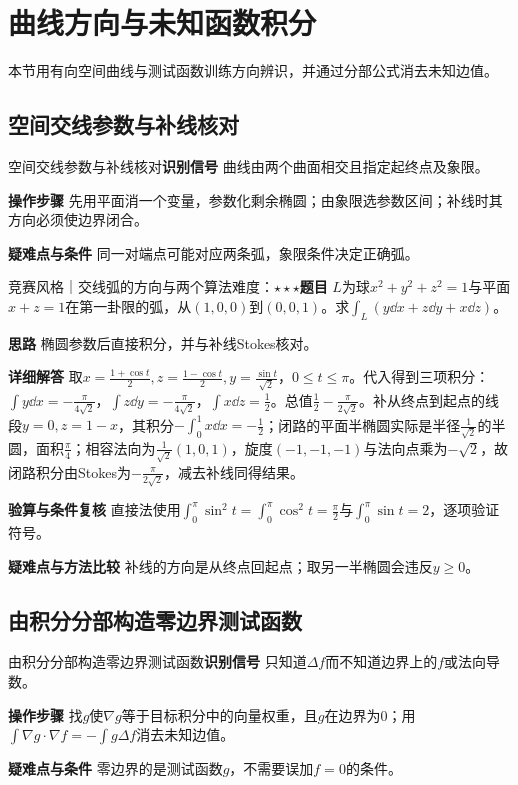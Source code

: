 \section{曲线方向与未知函数积分}\label{ic:delta_fields}

\begin{examtip}本节用有向空间曲线与测试函数训练方向辨识，并通过分部公式消去未知边值。\end{examtip}

\subsection{空间交线参数与补线核对}\label{ic:delta_fields:spaceorientation}\begin{method}{空间交线参数与补线核对}\textbf{识别信号} 曲线由两个曲面相交且指定起终点及象限。\par \textbf{操作步骤} 先用平面消一个变量，参数化剩余椭圆；由象限选参数区间；补线时其方向必须使边界闭合。\par \textbf{疑难点与条件} 同一对端点可能对应两条弧，象限条件决定正确弧。\end{method}

\begin{example}{竞赛风格｜交线弧的方向与两个算法}{难度：$\star\star\star$}\label{ic:ex:delta_fields:spacearc}\textbf{题目} $L$为球$x^2+y^2+z^2=1$与平面$x+z=1$在第一卦限的弧，从$(1,0,0)$到$(0,0,1)$。求$\int_L(y\dd x+z\dd y+x\dd z)$。\par \textbf{思路} 椭圆参数后直接积分，并与补线Stokes核对。\par \textbf{详细解答} 取$x=\frac{1+\cos t}{2},z=\frac{1-\cos t}{2},y=\frac{\sin t}{\sqrt2}$，$0\le t\le\pi$。代入得到三项积分：$\int y\dd x=-\frac{\pi}{4\sqrt2}$，$\int z\dd y=-\frac{\pi}{4\sqrt2}$，$\int x\dd z=\frac{1}{2}$。总值$\frac{1}{2}-\frac{\pi}{2\sqrt2}$。补从终点到起点的线段$y=0,z=1-x$，其积分$-\int_0^1x\dd x=-\frac{1}{2}$；闭路的平面半椭圆实际是半径$\frac{1}{\sqrt2}$的半圆，面积$\frac{\pi}{4}$；相容法向为$\frac{1}{\sqrt2}(1,0,1)$，旋度$(-1,-1,-1)$与法向点乘为$-\sqrt2$，故闭路积分由Stokes为$-\frac{\pi}{2\sqrt2}$，减去补线同得结果。\par \textbf{验算与条件复核} 直接法使用$\int_0^\pi\sin^2t=\int_0^\pi\cos^2t=\frac{\pi}{2}$与$\int_0^\pi\sin t=2$，逐项验证符号。\par \textbf{疑难点与方法比较} 补线的方向是从终点回起点；取另一半椭圆会违反$y\ge0$。\end{example}

\subsection{由积分分部构造零边界测试函数}\label{ic:delta_fields:testfunction}\begin{method}{由积分分部构造零边界测试函数}\textbf{识别信号} 只知道$\Delta f$而不知道边界上的$f$或法向导数。\par \textbf{操作步骤} 找$g$使$\nabla g$等于目标积分中的向量权重，且$g$在边界为0；用$\int\nabla g\cdot\nabla f=-\int g\Delta f$消去未知边值。\par \textbf{疑难点与条件} 零边界的是测试函数$g$，不需要误加$f=0$的条件。\end{method}

